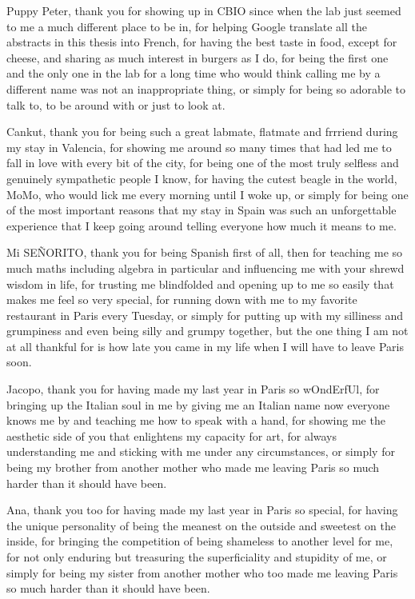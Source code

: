 Puppy Peter, thank you for showing up in CBIO since when the lab just seemed to me a much different place to be in, for helping Google translate all the abstracts in this thesis into French, for having the best taste in food, except for cheese, and sharing as much interest in burgers as I do, for being the first one and the only one in the lab for a long time who would think calling me by a different name was not an inappropriate thing, or simply for being so adorable to talk to, to be around with or just to look at.


Cankut, thank you for being such a great labmate, flatmate and frrriend during my stay in Valencia, for showing me around so many times that had led me to fall in love with every bit of the city, for being one of the most truly selfless and genuinely sympathetic people I know, for having the cutest beagle in the world, MoMo, who would lick me every morning until I woke up, or simply for being one of the most important reasons that my stay in Spain was such an unforgettable experience that I keep going around telling everyone how much it means to me.


Mi SE\~{N}ORITO, thank you for being Spanish first of all, then for teaching me so much maths including algebra in particular and influencing me with your shrewd wisdom in life, for trusting me blindfolded and opening up to me so easily that makes me feel so very special, for running down with me to my favorite restaurant in Paris every Tuesday, or simply for putting up with my silliness and grumpiness and even being silly and grumpy together, but the one thing I am not at all thankful for is how late you came in my life when I will have to leave Paris soon.


Jacopo, thank you for having made my last year in Paris so wOndErfUl, for bringing up the Italian soul in me by giving me an Italian name now everyone knows me by and teaching me how to speak with a hand, for showing me the aesthetic side of you that enlightens my capacity for art, for always understanding me and sticking with me under any circumstances, or simply for being my brother from another mother who made me leaving Paris so much harder than it should have been.


Ana, thank you too for having made my last year in Paris so special, for having the unique personality of being the meanest on the outside and sweetest on the inside, for bringing the competition of being shameless to another level for me, for not only enduring but treasuring the superficiality and stupidity of me, or simply for being my sister from another mother who too made me leaving Paris so much harder than it should have been.


